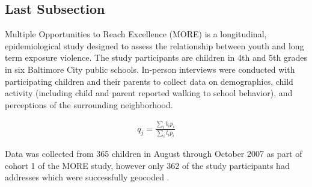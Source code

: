 \subsection*{Last Subsection}

Multiple Opportunities to Reach Excellence (MORE) is a longitudinal, epidemiological study designed to assess the relationship between youth and long term exposure violence. The study participants are children in 4th and 5th grades in six Baltimore City public schools. In-person interviews were conducted with participating children and their parents to collect data on demographics, child activity (including child and parent reported walking to school behavior), and perceptions of the surrounding neighborhood.

\begin{gather}
q_{j}=\frac{\sum_{i}b_{i}p_{i}}{\sum_{i}l_{i}p_{i}}
\end{gather}

Data was collected from 365 children in August through October 2007 as part of cohort 1 of the MORE study, however only 362 of the study participants had addresses which were successfully geocoded \cite{nelsen_introduction_2006}.

